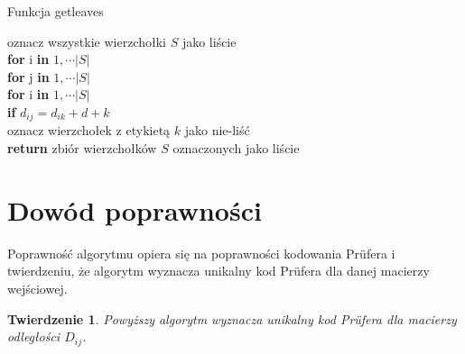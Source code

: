 \documentclass[a4paper,12p]{article}
\newcommand\tab[1][1cm]{\hspace*{#1}}
\begin{document}
\begin{algorithm}
		\caption{Funkcja getleaves}
		\label{algo}
		oznacz wszystkie wierzchołki $S$ jako liście \\
		\textbf{for} i \textbf{in} $1, \cdots |S|$ \\
		\tab \textbf{for} j \textbf{in} $1, \cdots |S|$ \\
		\tab \tab \textbf{for} i \textbf{in} $1, \cdots |S|$ \\
		\tab \tab \tab \textbf{if} $d_{ij} = d_{ik} + d+k$ \\
		\tab \tab \tab \tab oznacz wierzchołek z etykietą $k$ jako nie-liść \\
		\textbf{return} zbiór wierzchołków $S$ oznaczonych jako liście \\
\end{algorithm}

\section{Dowód poprawności}

Poprawność algorytmu opiera się na poprawności kodowania Prüfera i twierdzeniu, że algorytm wyznacza unikalny kod Prüfera dla danej macierzy wejściowej.

\newtheorem{lem}{Twierdzenie}

\begin{lem}
	Powyższy algorytm wyznacza unikalny kod Prüfera dla macierzy odległości $D_{ij}$.
\end{lem}
\end{document}
